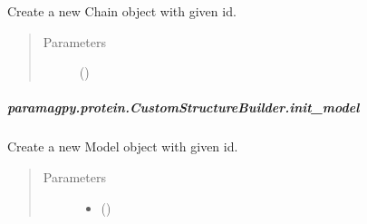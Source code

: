 \documentclass[a4paper,10pt,english,openany,oneside]{sphinxmanual}
\begin{document}
\begin{fulllineitems}
\begin{fulllineitems}
\begin{fulllineitems}
\label{\detokenize{reference/generated/paramagpy.protein.CustomStructureBuilder.init_chain:paramagpy.protein.CustomStructureBuilder.init_chain}}
\sphinxAtStartPar
Create a new Chain object with given id.
\begin{quote}\begin{description}
\item[{Parameters}] \leavevmode
\sphinxAtStartPar
{} () \textendash{} 

\end{description}\end{quote}

\end{fulllineitems}



\subparagraph{paramagpy.protein.CustomStructureBuilder.init\_model}
\label{\detokenize{reference/generated/paramagpy.protein.CustomStructureBuilder.init_model:paramagpy-protein-customstructurebuilder-init-model}}\label{\detokenize{reference/generated/paramagpy.protein.CustomStructureBuilder.init_model::doc}}

\begin{fulllineitems}
\label{\detokenize{reference/generated/paramagpy.protein.CustomStructureBuilder.init_model:paramagpy.protein.CustomStructureBuilder.init_model}}
\sphinxAtStartPar
Create a new Model object with given id.
\begin{quote}\begin{description}
\item[{Parameters}] \leavevmode\begin{itemize}
\item {} 
\sphinxAtStartPar
{} () \textendash{} 


\end{itemize}
\end{description}
\end{quote}
\end{fulllineitems}
\end{fulllineitems}
\end{fulllineitems}
\end{document}
